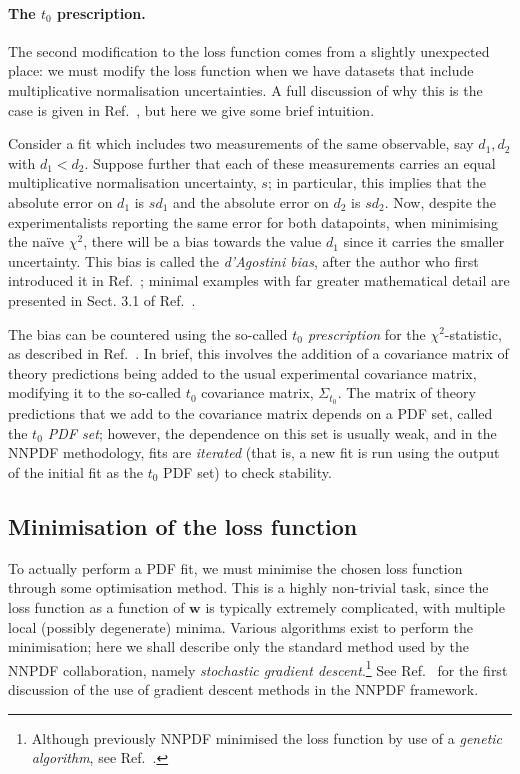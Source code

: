 \documentclass[withindex,glossary]{cam-thesis}
\renewcommand{\vec}[1]{\textbf{#1}} %
\begin{document}
\paragraph{The $t_0$ prescription.} The second modification to the loss function comes from a slightly unexpected place: we must modify the loss function when we have datasets that include multiplicative normalisation uncertainties. A full discussion of why this is the case is given in Ref.~\cite{Ball:2009qv}, but here we give some brief intuition. 

Consider a fit which includes two measurements of the same observable, say $d_1, d_2$ with $d_1 < d_2$. Suppose further that each of these measurements carries an equal multiplicative normalisation uncertainty, $s$; in particular, this implies that the absolute error on $d_1$ is $s d_1$ and the absolute error on $d_2$ is $s d_2$. Now, despite the experimentalists reporting the same error for both datapoints, when minimising the na\"{i}ve $\chi^2$, there will be a bias towards the value $d_1$ since it carries the smaller uncertainty. This bias is called the \textit{d'Agostini bias}, after the author who first introduced it in Ref.~\cite{DAgostini:1993arp}; minimal examples with far greater mathematical detail are presented in Sect. 3.1 of Ref.~\cite{Ball:2009qv}.

The bias can be countered using the so-called \textit{$t_0$ prescription} for the $\chi^2$-statistic, as described in Ref.~\cite{Ball:2009qv}. In brief, this involves the addition of a covariance matrix of theory predictions being added to the usual experimental covariance matrix, modifying it to the so-called $t_0$ covariance matrix, $\Sigma_{t_0}$. The matrix of theory predictions that we add to the covariance matrix depends on a PDF set, called the \textit{$t_0$ PDF set}; however, the dependence on this set is usually weak, and in the NNPDF methodology, fits are \textit{iterated} (that is, a new fit is run using the output of the initial fit as the $t_0$ PDF set) to check stability.

\subsection{Minimisation of the loss function}
To actually perform a PDF fit, we must minimise the chosen loss function through some optimisation method. This is a highly non-trivial task, since the loss function as a function of $\vec{w}$ is typically extremely complicated, with multiple local (possibly degenerate) minima. Various algorithms exist to perform the minimisation; here we shall describe only the standard method used by the NNPDF collaboration, namely \textit{stochastic gradient descent}.\footnote{Although previously NNPDF minimised the loss function by use of a \textit{genetic algorithm}, see Ref.~\cite{NNPDF:2014otw}.} See Ref.~\cite{Carrazza:2019mzf} for the first discussion of the use of gradient descent methods in the NNPDF framework.
\end{document}
